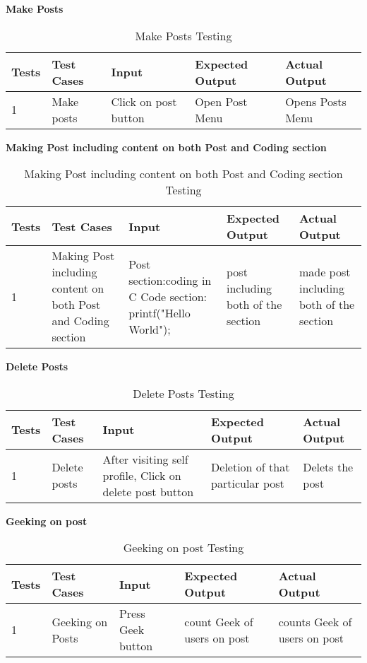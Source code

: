 \textbf{Make Posts}\\
\begin{table}[H]
    \caption{Make Posts Testing}
        \label{}
    \begin{tabular}{|p{0.3in}|p{1.2in}|p{1.2in}|p{1.2in}|p{1in}|}
        \hline
        Tests & Test Cases & Input &Expected Output & Actual Output \\
        \hline
            1 & Make posts& Click on post button& Open Post Menu& Opens Posts Menu \\
            \hline
\end{tabular}
\end{table}

\newpage
\textbf{Making Post including content on both Post and Coding section}\\
\begin{table}[H]
    \caption{Making Post including content on both Post and Coding section Testing}
        \label{}
    \begin{tabular}{|p{0.3in}|p{1.2in}|p{1.2in}|p{1.2in}|p{1in}|}
        \hline
        Tests & Test Cases & Input &Expected Output & Actual Output \\
        \hline
            1 & Making Post including content on both Post and Coding section& Post section:coding in C Code section: printf("Hello World");& post including both of the section& made post including both of the section\\
            \hline
\end{tabular}
\end{table}

\textbf{Delete Posts}\\
\begin{table}[H]
    \caption{Delete Posts Testing}
        \label{}
    \begin{tabular}{|p{0.3in}|p{1.2in}|p{1.2in}|p{1.2in}|p{1in}|}
        \hline
        Tests & Test Cases & Input &Expected Output & Actual Output \\
        \hline
            1 & Delete posts&After visiting self profile, Click on delete post button& Deletion of that particular post& Delets the post \\
            \hline
\end{tabular}
\end{table}

\textbf{Geeking on post}\\
\begin{table}[H]
    \caption{Geeking on post Testing}
        \label{}
    \begin{tabular}{|p{0.3in}|p{1.2in}|p{1.2in}|p{1.2in}|p{1in}|}
        \hline
        Tests & Test Cases & Input &Expected Output & Actual Output \\
        \hline
            1 & Geeking on Posts & Press Geek button& count Geek of users on post & counts Geek of users on post \\
            \hline
\end{tabular}
\end{table}

